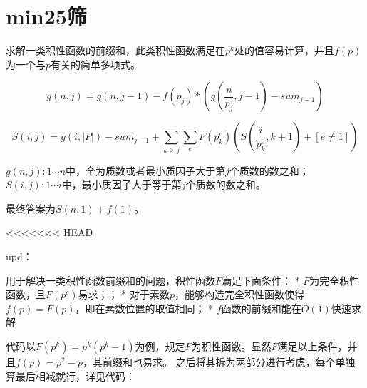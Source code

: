 \documentclass[a4paper,11pt,twoside,fontset = fandol,UTF8]{ctexbook} %
\begin{document}
	\section{min25筛}
	求解一类积性函数的前缀和，此类积性函数满足在$p^k$处的值容易计算，并且$f(p)$为一个与$p$有关的简单多项式。
	
	$$g(n,j)=g(n,j-1)-f(p_j)*(g(\frac{n}{p_j},j-1)-sum_{j-1})$$
	
	$$S(i,j)=g(i,|P|)-sum_{j-1}+\sum_{k\geq j}\sum_{e}F(p_k^e)(S(\frac{i}{p_k^e},k+1)+[e\not ={1}])$$
	
	$g(n,j):1\cdots n$中，全为质数或者最小质因子大于第$j$个质数的数之和；$S(i,j):1\cdots i$中，最小质因子大于等于第$j$个质数的数之和。
	
	最终答案为$S(n,1)+f(1)$。
	
<<<<<<< HEAD
	
	upd：
	
	用于解决一类积性函数前缀和的问题，积性函数$F$满足下面条件：
	* $F$为完全积性函数，且$F(p^c)$易求；；
	* 对于素数$p$，能够构造完全积性函数使得$f(p)=F(p)$，即在素数位置的取值相同；
	* $f$函数的前缀和能在$O(1)$快速求解
	
	代码以$F(p^k)=p^k(p^k-1)$为例，规定$F$为积性函数。显然$F$满足以上条件，并且$f(p)=p^2-p$，其前缀和也易求。
	之后将其拆为两部分进行考虑，每个单独算最后相减就行，详见代码：
	
\end{document}

